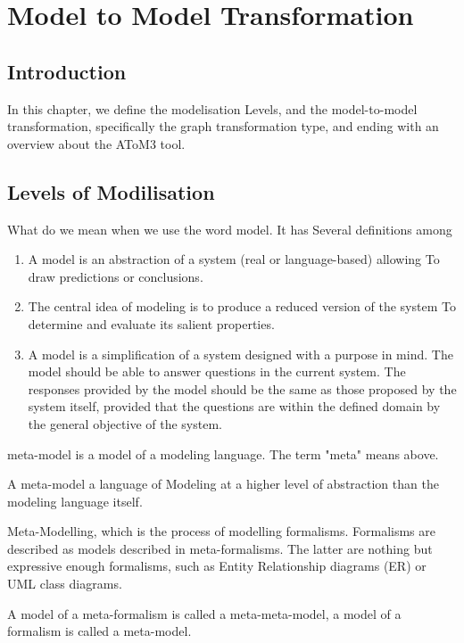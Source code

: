 \chapter{\label{cha: Graph Transformation}Model to Model Transformation}

\section{Introduction}
In this chapter, we define the modelisation Levels, and the model-to-model transformation, specifically the graph transformation type, and ending with an overview about the AToM3 tool.

\section{Levels of Modilisation}

What do we mean when we use the word model. It has Several definitions among

\begin{enumerate}
\item A model is an abstraction of a system (real or language-based) allowing
To draw predictions or conclusions\cite{ch3-matters}. 
\item The central idea of modeling is to produce a reduced version of the system To determine and evaluate its salient properties\cite{ch3-selic}. 

\item A model is a simplification of a system designed with a purpose in mind.
The model should be able to answer questions in the current system. The responses provided by the model should be the same as those proposed by the system itself, provided that the questions are within the defined domain by the general objective of the system\cite{ch3-def}.

\end{enumerate}

meta-model is a model of a modeling language. The term "meta" means above.

A meta-model a language of Modeling at a higher level of abstraction than the modeling language itself\cite{ch3-applied}.


Meta-Modelling, which is the process of modelling formalisms. 
Formalisms are described as models described in meta-formalisms. 
The latter are nothing but expressive enough formalisms, such as Entity Relationship diagrams (ER) or UML class diagrams.

A model of a meta-formalism is called a meta-meta-model, a model of a formalism is called a meta-model\cite{ch3-meta2}.

